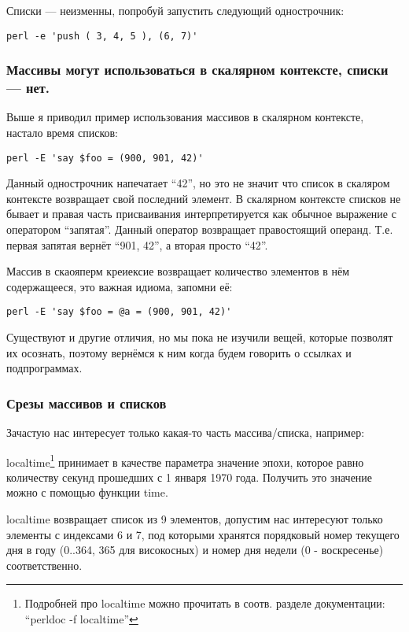 Списки --- неизменны, попробуй запустить следующий однострочник:
\begin{verbatim}
perl -e 'push ( 3, 4, 5 ), (6, 7)'
\end{verbatim}

\subsubsection*{Массивы могут использоваться в скалярном контексте, списки --- нет.}
Выше я приводил пример использования массивов в скалярном контексте, настало время списков:
\begin{verbatim}
perl -E 'say $foo = (900, 901, 42)'
\end{verbatim}
Данный однострочник напечатает ``42'', но это не значит что список в скаляром контексте возвращает свой
последний элемент. В скалярном контексте списков не бывает и правая часть присваивания интерпретируется
как обычное выражение с оператором ``запятая''. Данный оператор возвращает правостоящий операнд. Т.е.
первая запятая вернёт ``901, 42'', а вторая
просто ``42''.

Массив в скаояперм креиексие возвращает количество элементов в нём содержащееся, это важная идиома, запомни
её:

\begin{verbatim}
perl -E 'say $foo = @a = (900, 901, 42)'
\end{verbatim}

Существуют и другие отличия, но мы пока не изучили вещей, которые позволят их осознать, поэтому вернёмся к ним когда будем говорить о ссылках и подпрограммах.

\subsubsection{Срезы массивов и списков}

Зачастую нас интересует только какая-то часть массива/списка, например:


localtime\footnote{Подробней про localtime можно прочитать в соотв. разделе документации: ``perldoc -f localtime''} принимает в качестве параметра значение эпохи, которое равно количеству секунд прошедших
с 1 января 1970 года. Получить это значение можно с помощью функции time.


localtime возвращает список из 9 элементов, допустим нас интересуют только элементы с индексами 6 и 7,
под которыми хранятся порядковый номер текущего дня в году (0..364, 365 для високосных) и номер дня недели (0 - воскресенье)
соответственно.



